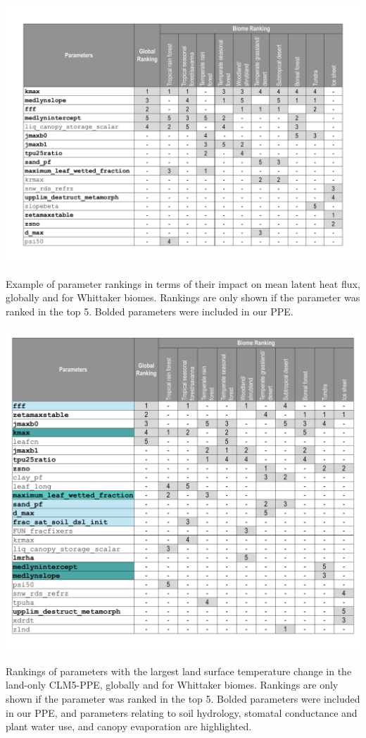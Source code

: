 \documentclass[draft, grl]{agujournal2019}
\begin{document}
 \captionsetup[table]{format=cancaption,labelformat=cancaptionlabel}
 \begin{table}[htb!]
 \centering
\noindent\includegraphics[width=\textwidth]{writing/figs/Table_Example_LH_Flux_Rankings.pdf}
  \caption{Example of parameter rankings in terms of their impact on mean latent heat flux, globally and for Whittaker biomes. Rankings are only shown if the parameter was ranked in the top 5. Bolded parameters were included in our PPE.}
 \label{table:LH_example_rankings}
 \end{table}

\begin{table}[htb!]
\noindent\includegraphics[width=\textwidth]{writing/figs/Table_Example_TSKIN_Rankings.pdf}
\caption{Rankings of parameters with the largest land surface temperature change in the land-only CLM5-PPE, globally and for Whittaker biomes. Rankings are only shown if the parameter was ranked in the top 5. Bolded parameters were included in our PPE, and parameters relating to soil hydrology, stomatal conductance and plant water use, and canopy evaporation are highlighted.}
\label{table:supp_param_rankings}
\end{table}
\end{document}
